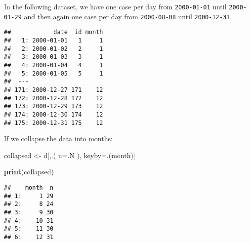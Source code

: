 \documentclass[]{book}
\newenvironment{Shaded}{\begin{snugshade}}{\end{snugshade}}
\newcommand{\KeywordTok}[1]{\textcolor[rgb]{0.13,0.29,0.53}{\textbf{#1}}}
\newcommand{\DataTypeTok}[1]{\textcolor[rgb]{0.13,0.29,0.53}{#1}}
\newcommand{\DecValTok}[1]{\textcolor[rgb]{0.00,0.00,0.81}{#1}}
\newcommand{\StringTok}[1]{\textcolor[rgb]{0.31,0.60,0.02}{#1}}
\newcommand{\OperatorTok}[1]{\textcolor[rgb]{0.81,0.36,0.00}{\textbf{#1}}}
\newcommand{\ErrorTok}[1]{\textcolor[rgb]{0.64,0.00,0.00}{\textbf{#1}}}
\newcommand{\NormalTok}[1]{#1}
\begin{document}
In the following dataset, we have one case per day from
\texttt{2000-01-01} until \texttt{2000-01-29} and then again one case
per day from \texttt{2000-08-08} until \texttt{2000-12-31}.

\begin{Shaded}
\end{Shaded}

\begin{verbatim}
##            date  id month
##   1: 2000-01-01   1     1
##   2: 2000-01-02   2     1
##   3: 2000-01-03   3     1
##   4: 2000-01-04   4     1
##   5: 2000-01-05   5     1
##  ---                     
## 171: 2000-12-27 171    12
## 172: 2000-12-28 172    12
## 173: 2000-12-29 173    12
## 174: 2000-12-30 174    12
## 175: 2000-12-31 175    12
\end{verbatim}

If we collapse the data into months:

\begin{Shaded}
\begin{Highlighting}[]
\NormalTok{collapsed <-}\StringTok{ }\NormalTok{d[,.(}
  \DataTypeTok{n=}\NormalTok{.N}
\NormalTok{), keyby=.(month)]}

\KeywordTok{print}\NormalTok{(collapsed)}
\end{Highlighting}
\end{Shaded}

\begin{verbatim}
##    month  n
## 1:     1 29
## 2:     8 24
## 3:     9 30
## 4:    10 31
## 5:    11 30
## 6:    12 31
\end{verbatim}
\end{document}
